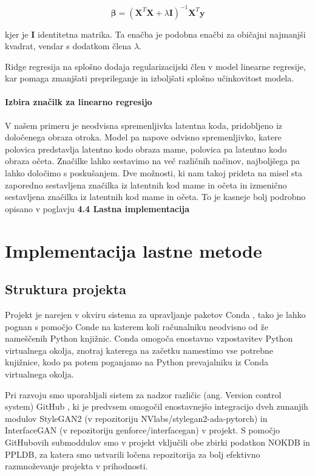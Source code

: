 \documentclass[a4paper,12pt,openright]{book}
\begin{document}
\begin{equation*}
\boldsymbol{\beta} = (\mathbf{X}^T \mathbf{X} + \lambda \mathbf{I})^{-1} \mathbf{X}^T \mathbf{y}
\end{equation*}


kjer je $\mathbf{I}$ identitetna matrika. Ta enačba je podobna enačbi za običajni najmanjši kvadrat, vendar s dodatkom člena $\lambda$.

Ridge regresija na splošno dodaja regularizacijski člen v model linearne regresije, kar pomaga zmanjšati preprileganje in izboljšati splošno učinkovitost modela.





\subsubsection{Izbira značilk za linearno regresijo}
V našem primeru je neodvisna spremenljivka latentna koda, pridobljeno iz določenega obraza otroka. Model pa napove odvisno spremenljivko, katere polovica predstavlja latentno kodo obraza mame, polovica pa latentno kodo obraza očeta. Značilke lahko sestavimo na več različnih načinov, najboljšega pa lahko določimo s poskušanjem. Dve možnosti, ki nam takoj prideta na misel sta zaporedno sestavljena značilka iz latentnih kod mame in očeta in izmenično sestavljena značilka iz latentnih kod mame in očeta. To je kasneje bolj podrobno opisano v poglavju \textbf{4.4 Lastna implementacija}



\chapter{Implementacija lastne metode}
\section{Struktura projekta}
Projekt je narejen v okviru sistema za upravljanje paketov Conda \cite{conda}, tako je lahko pognan s pomočjo Conde na katerem koli računalniku neodvisno od že nameščenih Python knjižnic. Conda omogoča enostavno vzpostavitev Python virtualnega okolja, znotraj katerega na začetku namestimo vse potrebne knjižnice, kodo pa potem poganjamo na Python prevajalniku iz Conda virtualnega okolja.

Pri razvoju smo uporabljali sistem za nadzor različic (ang. Version control system) GitHub \cite{github}, ki je predvsem omogočil enostavnejšo integracijo dveh zunanjih modulov StyleGAN2 (v repozitoriju NVlabs/stylegan2-ada-pytorch) \cite{stylegan2adapytorch} in InterfaceGAN (v repozitoriju genforce/interfacegan) \cite{interfacegan} v projekt. S pomočjo GitHubovih submoddulov smo v projekt vključili obe zbirki podatkon NOKDB in PPLDB, za katera smo ustvarili ločena repozitorija za bolj efektivno razmnoževanje projekta v prihodnosti.
\end{document}
